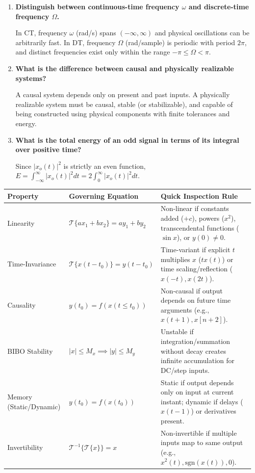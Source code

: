\documentclass[12pt,a4paper]{article}
\newcommand{\Q}[1]{\textbf{#1}\par\noindent\ignorespaces}
\renewcommand{\arraystretch}{1.45}
\begin{document}
\begin{tcolorbox}[exambox, title={\textbf{Frequently Asked / Viva Questions}}]
\begin{enumerate}[topsep=0pt, label=\textbf{Q\arabic*.}, itemsep=5pt]
  \item \Q{Distinguish between continuous-time frequency $\omega$ and discrete-time frequency $\Omega$.}
  In CT, frequency $\omega$ (rad/s) spans $(-\infty, \infty)$ and physical oscillations can be arbitrarily fast. In DT, frequency $\Omega$ (rad/sample) is periodic with period $2\pi$, and distinct frequencies exist only within the range $-\pi \le \Omega < \pi$.

  \item \Q{What is the difference between causal and physically realizable systems?}
  A causal system depends only on present and past inputs. A physically realizable system must be causal, stable (or stabilizable), and capable of being constructed using physical components with finite tolerances and energy.

  \item \Q{What is the total energy of an odd signal in terms of its integral over positive time?}
  Since $|x_o(t)|^2$ is strictly an even function, $E = \int_{-\infty}^{\infty} |x_o(t)|^2 dt = 2 \int_0^{\infty} |x_o(t)|^2 dt$.
\end{enumerate}
\end{tcolorbox}

\begin{tcolorbox}[tikzbox, title={\textbf{Summary Matrix: System Properties and Diagnostic Tests}}]
\par\vspace{4pt}\noindent
\begingroup
\setlength{\tabcolsep}{4.5pt}
\setlength{\extrarowheight}{3pt}
\renewcommand{\arraystretch}{1.35}
\begin{tabularx}{\linewidth}{|B{3.2cm}|B{3.5cm}|Y|}
\hline
\textbf{Property} & \textbf{Governing Equation} & \textbf{Quick Inspection Rule} \\
\hline
Linearity & $\mathcal{T}\{a x_1 + b x_2\} = a y_1 + b y_2$ & Non-linear if constants added ($+c$), powers ($x^2$), transcendental functions ($\sin x$), or $y(0) \ne 0$. \\
\hline
Time-Invariance & $\mathcal{T}\{x(t-t_0)\} = y(t-t_0)$ & Time-variant if explicit $t$ multiplies $x$ ($t x(t)$) or time scaling/reflection ($x(-t), x(2t)$). \\
\hline
Causality & $y(t_0) = f(x(t \le t_0))$ & Non-causal if output depends on future time arguments (e.g., $x(t+1), x[n+2]$). \\
\hline
BIBO Stability & $|x| \le M_x \implies |y| \le M_y$ & Unstable if integration/summation without decay creates infinite accumulation for DC/step inputs. \\
\hline
Memory (Static/Dynamic) & $y(t_0) = f(x(t_0))$ & Static if output depends only on input at current instant; dynamic if delays ($x(t-1)$) or derivatives present. \\
\hline
Invertibility & $\mathcal{T}^{-1}\{\mathcal{T}\{x\}\} = x$ & Non-invertible if multiple inputs map to same output (e.g., $x^2(t), \text{sgn}(x(t)), 0$). \\
\hline
\end{tabularx}
\endgroup
\end{tcolorbox}
\end{document}
